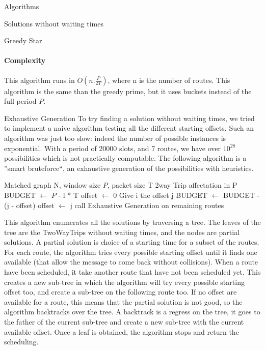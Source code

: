 \documentclass[a4paper,10pt]{report}
\begin{document}
\begin{chapter}{Algorithms}
\begin{section}{Solutions without waiting times}
\begin{subsection}{Greedy Star}
\paragraph{Complexity}
This algorithm runs in $O(n . \frac{P}{2T})$, where n is the number of routes.
This algorithm is the same than the greedy prime, but it uses buckets instead of the full period $P$.
\end{subsection}


\begin{subsection}{Exhaustive Generation}
 To try finding a solution without waiting times, we tried to implement a naive algorithm testing all the different starting offsets.
 Such an algorithm was just too slow: indeed the number of possible instances is exponential. With a period of 20000 slots,
 and 7 routes, we have over $10^{28}$ possibilities which is not practically computable.
 The following algorithm is a ''smart bruteforce``, an exhaustive generation of the possibilities with heuristics.
 
\begin{algorithm}[H]
\caption{Exhaustive Generation}
\begin{algorithmic}
\REQUIRE Matched graph N, window size $P$, packet size T
\ENSURE 2way Trip affectation in P
\STATE BUDGET $\leftarrow$ $P$ - l * T
\STATE offset $\leftarrow$ 0
\STATE Give i the offset j
\STATE BUDGET $\leftarrow$ BUDGET - (j - offset)
\STATE offset $\leftarrow$ j
\STATE call Exhaustive Generation on remaining routes
\ENDIF
\ENDFOR
\ENDFOR


\end{algorithmic}
\end{algorithm}

This algorithm enumerates all the solutions by traversing a tree. The leaves of the tree are 
the TwoWayTrips without waiting times, and the nodes are partial solutions. A partial solution is choice of a starting time for a subset of the routes.
For each route, the algorithm tries every possible starting offset until it finds one available (that allow the message to come back without collisions). When a route have been scheduled, it take another route that have not been scheduled yet.
This creates a new sub-tree in which the algorithm will try every possible starting offset too, and create a sub-tree on the following route too.
If no offset are available for a route, this means that the partial solution is not good, so the algorithm backtracks over the tree.
A backtrack is a regress on the tree, it goes to the father of the current sub-tree and create a new sub-tree with the current available offset.
Once a leaf is obtained, the algorithm stops and return the scheduling.


\end{subsection}
\end{section}
\end{chapter}
\end{document}
